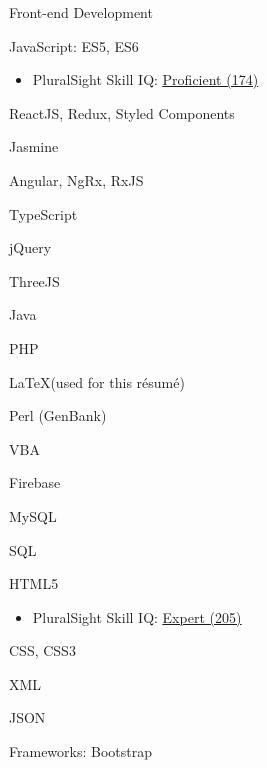 \documentclass[]{deedy-resume-openfont}
\begin{document}
\descript{}
\begin{tightemize}
\item Front-end Development\footnotemark[\value{footnote}]
\end{tightemize}
\sectionsep

\descript{}
\begin{tightemize}
\item JavaScript\footnotemark[\value{footnote}]: ES5, ES6
\begin{itemize}
\item PluralSight Skill IQ: \href{https://app.pluralsight.com/profile/alexander-koik-cesto}{\underline{Proficient (174)}}
\end{itemize}
\item ReactJS, Redux, Styled Components
\item Jasmine
\item Angular\footnotemark[\value{footnote}], NgRx, RxJS
\item TypeScript
\item jQuery\footnotemark[\value{footnote}]
\item ThreeJS
\item Java
\item PHP\footnotemark[\value{footnote}]
\item \LaTeX \xspace (used for this r\'esum\'e)
\item Perl (GenBank)
\item VBA\footnotemark[\value{footnote}]
\end{tightemize}
\sectionsep

\descript{}
\begin{tightemize}
\item Firebase
\end{tightemize}
\sectionsep

\descript{}
\begin{tightemize}
\item MySQL\footnotemark[\value{footnote}]
\item SQL
\end{tightemize}
\sectionsep

\descript{}
\begin{tightemize}
\item HTML5\footnotemark[\value{footnote}]
\begin{itemize}
\item PluralSight Skill IQ: \href{https://app.pluralsight.com/profile/alexander-koik-cesto}{\underline{Expert (205)}}
\end{itemize}
\item CSS\footnotemark[\value{footnote}], CSS3
\item XML
\item JSON\footnotemark[\value{footnote}]
\item Frameworks: Bootstrap
\end{tightemize}
\sectionsep
\end{document}
